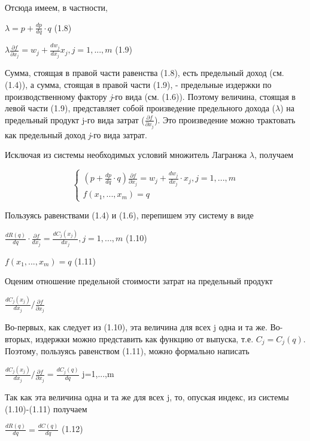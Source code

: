 \documentclass[12pt, 4paper]{book}
\begin{document}
{Отсюда имеем, в частности,
\begin{center}
$\lambda = p + \frac{dp}{dq}\cdot q$ (1.8)
\end{center}
\begin{center}
$\lambda\frac{\partial f}{\partial x_j}=w_j+\frac{d w_j}{d x_j}x_j, j=1,...,m$ (1.9)
\end{center}
\par

Сумма, стоящая в правой части равенства (1.8), есть предельный доход (см. (1.4)), а сумма, стоящая в правой части (1.9), - предельные издержки по производственному фактору \textit{j}-го вида (см. (1.6)). Поэтому величина, стоящая в левой части (1.9), представляет собой произведение предельного дохода ($\lambda$) на предельный продукт j-го вида затрат ($\frac{\partial f}{\partial x_j}$). Это произведение можно трактовать как предельный доход \textit{j}-го вида затрат.
\par

Исключая из системы необходимых условий множитель Лагранжа $\lambda$, получаем
\begin{center}
$$\left\{
\begin{aligned}
(p + \frac{dp}{dq}\cdot q)\frac{\partial f}{\partial x_j} = w_j + \frac{d w_j}{d x_j}\cdot x_j ,j=1,...,m \\
f(x_1,...,x_m)=q
\end{aligned}
\right.$$
\end{center}
\par

Пользуясь равенствами (1.4) и (1.6), перепишем эту систему в виде
\begin{center}
$\frac{d R(q)}{d q}\cdot \frac{\partial f}{d x_j} = \frac{d C_j(x_j)}{d x_j}, j=1,...,m$ (1.10)
\end{center}
\begin{center}
$f(x_1,...,x_m) = q$ (1.11)
\end{center}
\par

Оценим отношение предельной стоимости затрат на предельный продукт
\begin{center}
$\frac{dC_j(x_j)}{d x_j}/\frac{\partial f}{\partial x_j}$
\end{center}
\par

Во-первых, как следует из (1.10), эта величина для всех j одна и та же. Во-вторых, издержки можно представить как функцию от выпуска, т.е. $C_j = C_j(q)$. 
Поэтому, пользуясь равенством (1.11), можно формально написать
\begin{center}
$\frac{dC_j(x_j)}{d x_j}/\frac{\partial f}{\partial x_j} = \frac{dC_j(q)}{dq}$ j=1,...,m
\end{center}
Так как эта величина одна и та же для всех j, то, опуская индекс, из системы (1.10)-(1.11) получаем
\begin{center}
$\frac{d R(q)}{d q} = \frac{d C(q)}{d q}$ (1.12)
\end{center}
\par

}
\end{document}
